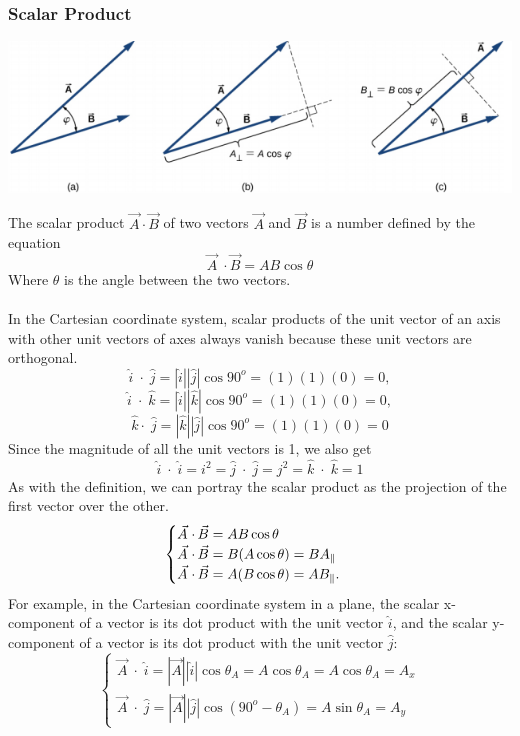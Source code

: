 \documentclass[12pt,addpoints]{exam}
\begin{document}
	\subsubsection*{Scalar Product}
	\begin{center}
		\includegraphics[scale=0.5]{dot.png}
	\end{center}
	The scalar product $\vec{A}\cdot\vec{B}$ of two vectors $\vec{A}$ and $\vec{B}$ is a number defined by the equation
	$$\vec{A}\; \cdotp \vec{B} = AB \cos \theta$$
	Where $\theta$ is the angle between the two vectors.\\ \\
	In the Cartesian coordinate system, scalar products of the unit vector of an axis with other unit vectors of axes always vanish because these unit vectors are orthogonal.
	$$\hat{i}\; \cdotp\; \hat{j} = |\hat{i}||\hat{j}| \cos 90^{o} = (1)(1)(0) = 0,$$
	$$\hat{i}\; \cdotp\; \hat{k} = |\hat{i}||\hat{k}| \cos 90^{o} = (1)(1)(0) = 0,$$
	$$\hat{k} \cdotp\; \hat{j} = |\hat{k}||\hat{j}| \cos 90^{o} = (1)(1)(0) = 0 $$
	Since the magnitude of all the unit vectors is 1, we also get
	$$\hat{i}\; \cdotp\; \hat{i} = i^{2} = \hat{j}\; \cdotp\; \hat{j} = j^{2} = \hat{k}\; \cdotp\; \hat{k} = 1$$
	As with the definition, we can portray the scalar product as the projection of the first vector over the other.
	$$\begin{cases} \vec{A}\; \cdotp \vec{B}  = AB \cos \theta \\ \vec{A}\; \cdotp \vec{B} = B(A \cos \theta) = BA_{\parallel} \\ \vec{A}\; \cdotp \vec{B} = A(B \cos \theta) = AB_{\parallel} \ldotp \end{cases}$$
	For example, in the Cartesian coordinate system in a plane, the scalar x-component of a vector is its dot product with the unit vector $\hat{i}$, and the scalar y-component of a vector is its dot product with the unit vector $\hat{j}$:
	$$\begin{cases} \vec{A}\; \cdotp\; \hat{i} = |\vec{A}||\hat{i}| \cos \theta_{A} = A \cos \theta_{A} = A \cos \theta_{A} = A_{x} \\ \vec{A}\; \cdotp\; \hat{j} = |\vec{A}||\hat{j}| \cos (90^{o} - \theta_{A}) = A \sin \theta_{A} = A_{y} \end{cases}$$
\end{document}
